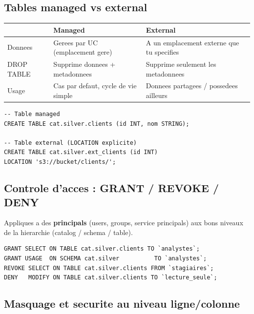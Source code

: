 \documentclass[11pt,a4paper]{article}
\begin{document}
\subsection{Tables managed vs external}

\begin{center}
\renewcommand{\arraystretch}{1.3}
\begin{tabular}{@{}p{3cm}p{5.5cm}p{5.5cm}@{}}
\toprule
 & \textbf{Managed} & \textbf{External} \\
\midrule
Donnees & Gerees par UC (emplacement gere) & A un emplacement externe que tu specifies \\
DROP TABLE & Supprime donnees + metadonnees & Supprime seulement les metadonnees \\
Usage & Cas par defaut, cycle de vie simple & Donnees partagees / possedees ailleurs \\
\bottomrule
\end{tabular}
\end{center}

\begin{lstlisting}[style=sqlstyle,caption={Creation et conversion de tables}]
-- Table managed
CREATE TABLE cat.silver.clients (id INT, nom STRING);

-- Table external (LOCATION explicite)
CREATE TABLE cat.silver.ext_clients (id INT)
LOCATION 's3://bucket/clients/';
\end{lstlisting}

\subsection{Controle d'acces : GRANT / REVOKE / DENY}

Appliques a des \textbf{principals} (users, groups, service principals) aux bons niveaux de
la hierarchie (catalog / schema / table).

\begin{lstlisting}[style=sqlstyle,caption={Privileges Unity Catalog}]
GRANT SELECT ON TABLE cat.silver.clients TO `analystes`;
GRANT USAGE  ON SCHEMA cat.silver          TO `analystes`;
REVOKE SELECT ON TABLE cat.silver.clients FROM `stagiaires`;
DENY   MODIFY ON TABLE cat.silver.clients TO `lecture_seule`;
\end{lstlisting}

\subsection{Masquage et securite au niveau ligne/colonne}
\end{document}
